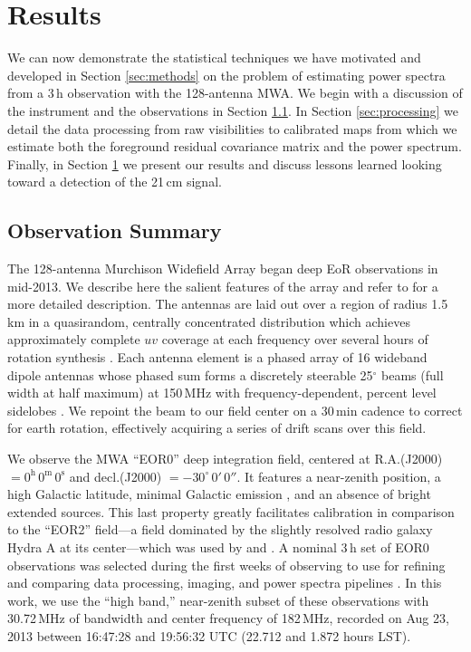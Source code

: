 
\section{Results} \label{sec:results}

We can now demonstrate the statistical techniques we have motivated and developed in Section \ref{sec:methods} on the problem of estimating power spectra from a 3\,h observation with the 128-antenna MWA. We begin with a discussion of the instrument and the observations in Section \ref{sec:observation}. In Section \ref{sec:processing} we detail the data processing from raw visibilities to calibrated maps from which we estimate both the foreground residual covariance matrix and the power spectrum. Finally, in Section \ref{sec:results} we present our results and discuss lessons learned looking toward a detection of the 21\,cm signal.


\subsection{Observation Summary} \label{sec:observation}

The 128-antenna Murchison Widefield Array began deep EoR observations in mid-2013. We describe here the salient features of the array and refer to \cite{TingaySummary} for a more detailed description. The antennas are laid out over a region of radius 1.5\,km in a quasirandom, centrally concentrated distribution which achieves approximately complete $uv$ coverage at each frequency over several hours of rotation synthesis \cite{beardsley13}. Each antenna element is a phased array of 16 wideband dipole antennas whose phased sum forms a discretely steerable 25$^\circ$ beams (full width at half maximum) at 150\,MHz with frequency-dependent, percent level sidelobes \cite{neben15}. We repoint the beam to our field center on a 30\,min cadence to correct for earth rotation, effectively acquiring a series of drift scans over this field. 

We observe the MWA ``EOR0'' deep integration field, centered at R.A.(J2000) $= 0^\text{h}\,0^\text{m}\,0^\text{s}$ and decl.(J2000) $= -30^\circ\,0'\,0''$. It features a near-zenith position, a high Galactic latitude, minimal Galactic emission \cite{GSM}, and an absence of bright extended sources. This last property greatly facilitates calibration in comparison to the ``EOR2'' field---a field dominated by the slightly resolved radio galaxy Hydra A at its center---which was used by \cite{williamsimaging} and \cite{X13}. A nominal 3\,h set of EOR0 observations was selected during the first weeks of observing to use for refining and comparing data processing, imaging, and power spectra pipelines \cite{JacobsPipelines}. In this work, we use the ``high band,'' near-zenith subset of these observations with 30.72\,MHz of bandwidth and center frequency of 182\,MHz, recorded on Aug 23, 2013 between 16:47:28 and 19:56:32 UTC (22.712 and 1.872 hours LST). 

